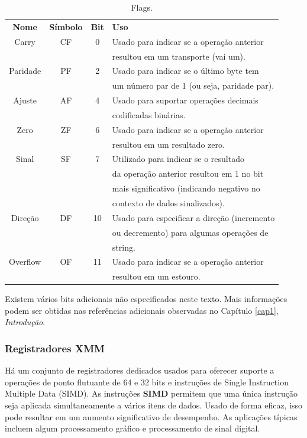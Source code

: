 \begin{table}[h]
	\centering
	\begin{tabular}{|c|c|c|l|}
		\hline
		\rowcolor[HTML]{C0C0C0} 
		\textbf{Nome} & \textbf{Símbolo} & \textbf{Bit} & \textbf{Uso} \\ 
		Carry & CF & 0  & Usado para indicar se a operação anterior\\
		& & & resultou em um transporte (vai um).\\ \hline
		Paridade & PF& 2 & Usado para indicar se o último byte tem\\
		& & &  um número par de 1 (ou seja, paridade par).\\ \hline
		Ajuste & AF& 4 & Usado para suportar operações decimais\\
		& & &  codificadas binárias.\\ \hline
		Zero & ZF& 6 & Usado para indicar se a operação anterior\\
		& & &  resultou em um resultado zero.\\ \hline
		Sinal & SF& 7 & Utilizado para indicar se o resultado\\
		& & &  da operação anterior resultou em 1 no bit\\
		& & &  mais significativo (indicando negativo no\\
		& & &  contexto de dados sinalizados).\\ \hline
		Direção & DF& 10 & Usado para especificar a direção (incremento\\
		& & &  ou decremento) para algumas operações de\\
		& & &  string.\\ \hline
		Overflow & OF& 11 & Usado para indicar se a operação anterior\\
		& & &  resultou em um estouro.\\ \hline
	\end{tabular}
	
	\caption{Flags.}
	\label{tab:flags}
\end{table}

Existem vários bits adicionais não especificados neste texto. Mais informações podem ser obtidas nas referências adicionais observadas no Capítulo \ref{cap1}, \textit{Introdução}.

\subsubsection{Registradores XMM}
Há um conjunto de registradores dedicados usados para oferecer suporte a operações de ponto flutuante de 64 e 32 bits e instruções de Single Instruction Multiple Data (SIMD). As instruções \textbf{SIMD} permitem que uma única instrução seja aplicada simultaneamente a vários itens de dados. Usado de forma eficaz, isso pode resultar em um aumento significativo de desempenho. As aplicações típicas incluem algum processamento gráfico e processamento de sinal digital.

